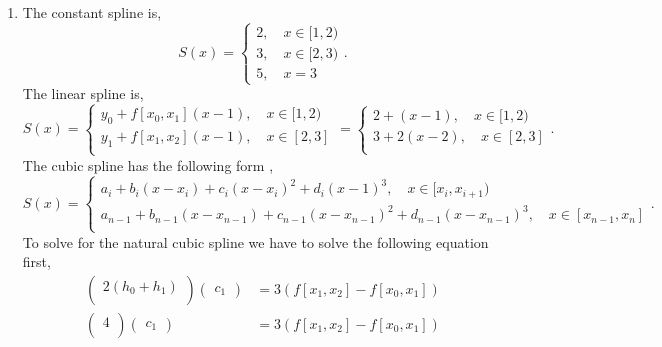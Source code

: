 \documentclass{report}
\begin{document}
\begin{solution}
	\begin{enumerate}[label=(\alph*)]
		\item The constant spline is,
		      \[
			      S\left( x \right)  = \begin{cases}
				      2 , \quad x\in[1,2) \\
				      3,\quad x\in[2,3)   \\
				      5,\quad x= 3
			      \end{cases}
			      .\]
		      The linear spline is,
		      \[
			      S\left( x \right)  =  \begin{cases}
				      y_0+ f[x_0,x_1](x-1), \quad x\in[1,2) \\
				      y_1 + f[x_1,x_2](x-1),\quad x\in[2,3] \\
			      \end{cases}
			      = \begin{cases}
				      2+ (x-1) , \quad x\in[1,2)   \\
				      3 + 2(x-2) , \quad x\in[2,3] \\
			      \end{cases}
			      .\]
		      The cubic spline has the following form ,
		      \[
			      S(x) = \begin{cases}
				      a_{i}+b_{i}(x-x_{i}) + c_{i}(x-x_{i})^{2} + d_{i}(x-1)^3 , \quad x\in[x_{i},x_{i+1})            \\
				      a_{n-1}+b_{n-1}(x-x_{n-1})+c_{n-1}(x-x_{n-1})^2+d_{n-1}(x-x_{n-1})^3, \quad x\in[x_{n-1},x_{n}] \\
			      \end{cases}
			      .\]
		      To solve for the natural cubic spline we have to solve the following equation first,
		      \begin{align*}
			      \begin{pmatrix}
				      2(h_0+h_1) \\
			      \end{pmatrix} \begin{pmatrix} c_1  \end{pmatrix} & =  3\left( f[x_1,x_2] - f[x_0,x_1] \right) \\
			      \begin{pmatrix}
				      4 \\
			      \end{pmatrix} \begin{pmatrix} c_1  \end{pmatrix} & =  3\left( f[x_1,x_2] - f[x_0,x_1] \right) \\

\end{align*}
\end{enumerate}
\end{solution}
\end{document}
